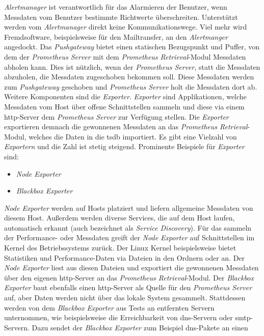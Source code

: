 \documentclass[titlepage]{report}
\begin{document}
\emph{Alertmanager} ist verantwortlich für das Alarmieren der Benutzer,
wenn Messdaten vom Benutzer bestimmte Richtwerte überschreiten.
Unterstützt werden vom \emph{Alertmanager} direkt keine
Kommunikationswege. Viel mehr wird Fremdsoftware, beispielsweise für den
Mailtransfer, an den \emph{Alertmanger} angedockt. Das
\emph{Pushgateway} bietet einen statischen Bezugspunkt und Puffer, von dem der
\emph{Prometheus Server} mit dem \emph{Prometheus Retrieval}\hyp{}Modul Messdaten
abholen kann. Dies ist nützlich, wenn der \emph{Prometheus Server}, statt
die Messdaten abzuholen, die Messdaten zugeschoben bekommen soll. Diese Messdaten
werden zum \emph{Pushgateway} geschoben und \emph{Prometheus
Server} holt die Messdaten dort ab. Weitere Komponenten sind die
\emph{Exporter}. \emph{Exporter} sind Applikationen, welche
Messdaten vom Host über offene Schnittstellen sammeln und diese via einem
\gls{http}\hyp{}Server dem \emph{Prometheus Server} zur Verfügung
stellen. Die \emph{Exporter} exportieren demnach die gewonnenen Messdaten an das
\emph{Prometheus Retrieval}\hyp{}Modul, welches die Daten in die
\gls{tsdb} importiert. Es gibt eine Vielzahl von
\emph{Exportern} und die Zahl ist stetig steigend. Prominente Beispiele
für \emph{Exporter} sind:
\begin{itemize}
    \item \emph{Node Exporter}
    \item \emph{Blackbox Exporter}
\end{itemize}
\emph{Node Exporter} werden auf Hosts platziert und liefern allgemeine
Messdaten von diesem Host. Außerdem werden diverse Services, die auf dem
Host laufen, automatisch erkannt (auch bezeichnet als \emph{Service
Discovery}). Für das sammeln der Performance\hyp{} oder Messdaten greift
der \emph{Node Exporter} auf Schnittstellen im Kernel des
Betriebssystems zurück. Der Linux Kernel beispielsweise bietet
Statistiken und Performance\hyp{}Daten via Dateien in den Ordnern
 oder  an. Der \emph{Node Exporter} liest
aus diesen Dateien und exportiert die gewonnenen Messdaten über den
eigenen \gls{http}\hyp{}Server an das \emph{Prometheus
Retrieval}\hyp{}Modul. Der \emph{Blackbox Exporter} baut ebenfalls einen
\gls{http}\hyp{}Server als Quelle für den \emph{Prometheus Server} auf,
aber Daten werden nicht über das lokale System  gesammelt. Stattdessen
werden von dem \emph{Blackbox Exporter} aus Tests an entfernten Servern
unternommen, wie beispielsweise die Erreichbarkeit von
\gls{dns}\hyp{}Servern oder \gls{smtp}\hyp{}Servern. Dazu sendet der
\emph{Blackbox Exporter} zum Beispiel \gls{dns}\hyp{}Pakete an einen
\end{document}
